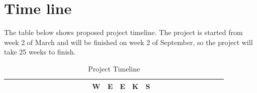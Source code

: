 \documentclass[11pt]{article}
\begin{document}
	\section{Time line}
	The table below shows proposed project timeline. The project is started from week 2 of March and will be finished on week 2 of September, so the project will take 25 weeks to finish. 
	\begin{table}[h]
		\centering
		\caption{Project Timeline}
		\label{timeline_table}
		\begin{tabular}{lp{0.1cm}p{0.1cm}p{0.1cm}p{0.1cm}p{0.1cm}p{0.1cm}p{0.1cm}p{0.1cm}p{0.1cm}p{0.1cm}p{0.1cm}p{0.1cm}p{0.1cm}p{0.1cm}p{0.1cm}p{0.1cm}p{0.1cm}p{0.1cm}p{0.1cm}p{0.1cm}p{0.1cm}p{0.1cm}p{0.1cm}p{0.1cm}p{0.1cm}p{0.1cm}} \hline
			&                                                                      &                                               &                                               &                                               &                                               &                                               &                                               &                                               &                                               &                                               &                                               & W                                             & E                                             & E                                             & K                                             & S                                             &                                               &                                               &                                               &                                               &                                               &                                               &                                               &                                               &                                                                                              \\ \hline

\end{tabular}
\end{table}
\end{document}

